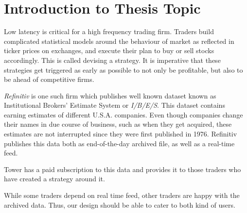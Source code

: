 
\chapter{Introduction to Thesis Topic} %

\label{Chapter1} %


\setlength{\parindent}{10ex}
Low latency is critical for a high frequency trading firm. Traders build complicated statistical models around the behaviour of market as reflected in ticker prices on exchanges, and execute their plan to buy or sell stocks accordingly. This is called devising a strategy. It is imperative that these strategies get triggered as early as possible to not only be profitable, but also to be ahead of competitive firms. \par
\emph{Refinitiv \texttrademark} is one such firm which publishes well known dataset known as Institutional Brokers' Estimate System or \emph{I/B/E/S}. This dataset contains earning estimates of different U.S.A. companies. Even though companies change their names in due course of business, such as when they get acquired, these estimates are not interrupted since they were first published in 1976. Refinitiv publishes this data both as end-of-the-day archived file, as well as a real-time feed. \par
Tower has a paid subscription to this data and provides it to those traders who have created a strategy around it. \par
While some traders depend on real time feed, other traders are happy with the archived data. Thus, our design should be able to cater to both kind of users.